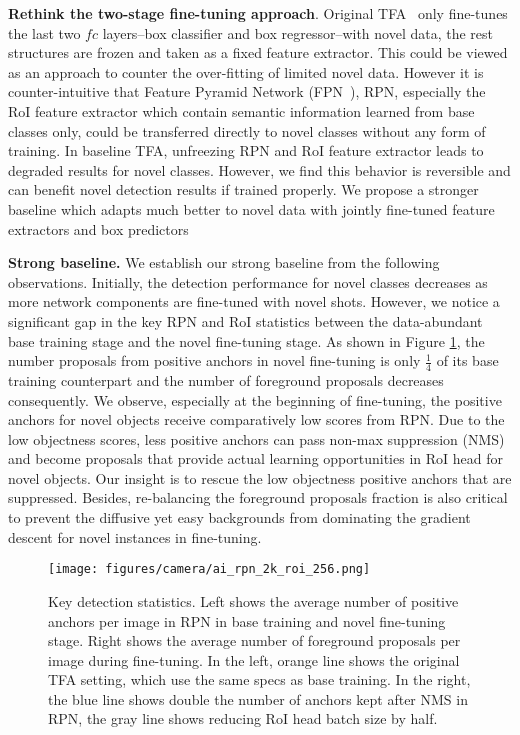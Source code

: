 \documentclass[final]{cvpr}
\begin{document}
\textbf{Rethink the two-stage fine-tuning approach}. Original TFA~\cite{wang_frustratingly_2020} only fine-tunes the last two $fc$ layers--box classifier and box regressor--with novel data, the rest structures are frozen and taken as a fixed feature extractor. This could be viewed as an approach to counter the over-fitting of limited novel data. However it is counter-intuitive that Feature Pyramid Network (FPN~\cite{lin_feature_2017}), RPN, especially the RoI feature extractor which contain semantic information learned from base classes only, could be transferred directly to novel classes without any form of training.  In baseline TFA, unfreezing RPN and RoI feature extractor leads to degraded results for novel classes. However, we find this behavior is reversible and can  benefit novel detection results if trained properly. We propose a stronger baseline which adapts much better to novel data with jointly fine-tuned feature extractors and box predictors 

\textbf{Strong baseline.} We establish our strong baseline from the following observations. Initially, the detection performance for novel classes decreases as more network components are fine-tuned with novel shots. However, we notice a significant gap in the key RPN and RoI statistics between the data-abundant base training stage and the novel fine-tuning stage. As shown in Figure \ref{fig:rpn-roi}, the number proposals from positive anchors in novel fine-tuning is only $\frac14$ of its base training counterpart and the number of foreground proposals decreases consequently. We observe, especially at the beginning of fine-tuning, the positive anchors for novel objects receive comparatively low scores from RPN. Due to the low objectness scores, less positive anchors can pass non-max suppression (NMS) and become proposals that provide actual learning opportunities in RoI head for novel objects. Our insight is to rescue the low objectness positive anchors that are suppressed. Besides, re-balancing the foreground proposals fraction is also critical to prevent the diffusive yet easy backgrounds from dominating the gradient descent for novel instances in fine-tuning. 


\begin{figure}[t]
\begin{center}
\texttt{[image: figures/camera/ai\_rpn\_2k\_roi\_256.png]}
\end{center}
\vspace{-2.5mm}
\caption{Key detection statistics. Left shows the average number of positive anchors per image in RPN in base training and novel fine-tuning stage. Right shows the average number of foreground proposals per image during fine-tuning. In the left, orange line shows the original TFA setting, which use the same specs as base training. In the right, the blue line shows double the number of anchors kept after NMS in RPN, the gray line shows reducing RoI head batch size by half.} 
\label{fig:rpn-roi}
\end{figure}
\end{document}
